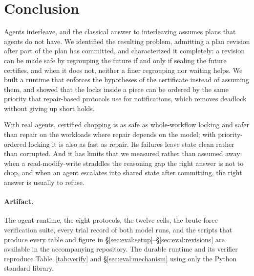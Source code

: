 \section{Conclusion}
\label{sec:conclusion}

Agents interleave, and the classical answer to interleaving assumes plans that
agents do not have. We identified the resulting problem, admitting a plan
revision after part of the plan has committed, and characterized it
completely: a revision can be made safe by regrouping the future if and only
if sealing the future certifies, and when it does not, neither a finer
regrouping nor waiting helps. We built a runtime that enforces the hypotheses
of the certificate instead of assuming them, and showed that the locks inside
a piece can be ordered by the same priority that repair-based protocols use
for notifications, which removes deadlock without giving up short holds.

With real agents, certified chopping is as safe as whole-workflow locking and
safer than repair on the workloads where repair depends on the model; with
priority-ordered locking it is also as fast as repair. Its failures leave
state clean rather than corrupted. And it has limits that we measured rather
than assumed away: when a read-modify-write straddles the reasoning gap the
right answer is not to chop, and when an agent escalates into shared state
after committing, the right answer is usually to refuse.

\paragraph{Artifact.}
The agent runtime, the eight protocols, the twelve cells, the brute-force
verification suite, every trial record of both model runs, and the scripts
that produce every table and figure in \S\ref{sec:eval:setup}--\S\ref{sec:eval:revisions}
are available in the accompanying repository. The durable runtime and its
verifier reproduce Table~\ref{tab:verify} and \S\ref{sec:eval:mechanism}
using only the Python standard library.
